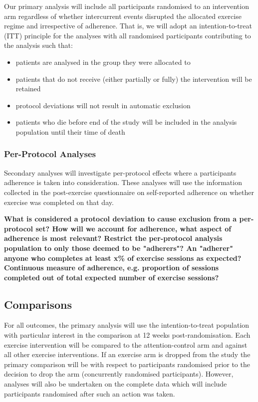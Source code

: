 \documentclass[
]{article}
\providecommand{\tightlist}{%
  \setlength{\itemsep}{0pt}\setlength{\parskip}{0pt}}
\begin{document}
Our primary analysis will include all participants randomised to an intervention arm regardless of whether intercurrent events disrupted the allocated exercise regime and irrespective of adherence.
That is, we will adopt an intention-to-treat (ITT) principle for the analyses with all randomised participants contributing to the analysis such that:

\begin{itemize}
  \tightlist
  \item patients are analysed in the group they were allocated to
  \item patients that do not receive (either partially or fully) the intervention will be retained
  \item protocol deviations will not result in automatic exclusion
  \item patients who die before end of the study  will be included in the analysis population until their time of death
\end{itemize}

\subsubsection{Per-Protocol Analyses}

Secondary analyses will investigate per-protocol effects where a participants adherence is taken into consideration.
These analyses will use the information collected in the post-exercise questionnaire on self-reported adherence on whether exercise was completed on that day.

\textbf{
What is considered a protocol deviation to cause exclusion from a per-protocol set?
How will we account for adherence, what aspect of adherence is most relevant? 
Restrict the per-protocol analysis population to only those deemed to be "adherers"?
An "adherer" anyone who completes at least x\% of exercise sessions as expected?
Continuous measure of adherence, e.g. proportion of sessions completed out of total expected number of exercise sessions?
}

\hypertarget{analysis-comparisons}{%
\subsection{Comparisons}\label{analysis-comparisons}}

For all outcomes, the primary analysis will use the intention-to-treat population with particular interest in the comparison at 12 weeks post-randomisation.
Each exercise intervention will be compared to the attention-control arm and against all other exercise interventions.
If an exercise arm is dropped from the study the primary comparison will be with respect to participants randomised prior to the decision to drop the arm (concurrently randomised participants).
However, analyses will also be undertaken on the complete data which will include participants randomised after such an action was taken.
\end{document}
